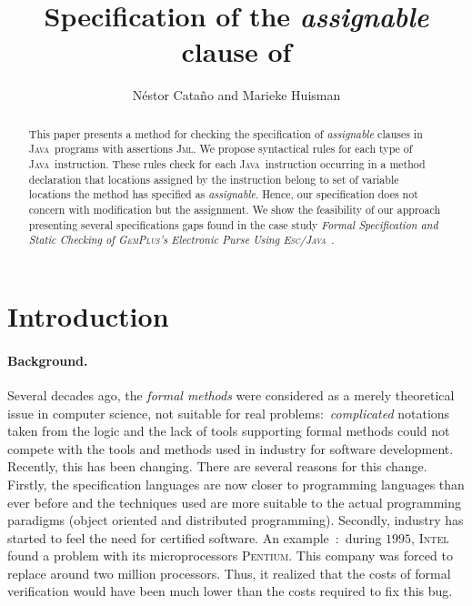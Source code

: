 \documentclass[a4paper]{llncs}
\title{Specification of the \emph{assignable} clause of \jml}
\author{
  N\'estor Cata\~no and Marieke Huisman  \\
  \institute{
       \inria~Sophia-Antipolis, France \\
       \lemme~Project
  } 
  \email{\{Nestor.Catano, Marieke.Huisman\}@sophia.inria.fr}
}
\newcommand{\jml}{\textsc{Jml}}
\newcommand{\java}{\textsc{Java}}
\newcommand{\gplus}{\textsc{GemPlus}}
\begin{document}
\fussy
\maketitle
\pagestyle{plain}

\begin{abstract}
This paper presents a method for checking the specification of
\emph{assignable} clauses in \java~programs with assertions \jml. We
propose syntactical rules for each type of \java~instruction. These
rules check for each \java~instruction occurring in a method
declaration that locations assigned by the instruction belong to set
of variable locations the method has specified as
\emph{assignable}. Hence, our specification does not concern with
modification but the assignment. We show the feasibility of our
approach presenting several specifications gaps found in the case
study \emph{Formal Specification and Static Checking of \gplus's
Electronic Purse Using \textsc{Esc/Java}}~\cite{CatanoH02a}.
\end{abstract}






\section{Introduction}
\label{sec-intro}

\paragraph{\bf Background.}
Several decades ago, the \emph{formal methods} were considered as a merely
theoretical issue in computer science, not suitable for real
problems$:$ \emph{complicated} notations taken from the logic and
the lack of tools supporting formal methods could not compete with the
tools and methods used in industry for software development. Recently, 
this has been changing. There are several reasons for this
change. Firstly, the specification languages are now closer to
programming languages than ever before and the techniques used are
more suitable to the actual programming paradigms (object oriented
and distributed programming). Secondly, industry has started to feel
the need for certified software. An
example~\cite{Borger99programmer}$:$ during $1995$,
\textsc{Intel} found a problem with its microprocessors
\textsc{Pentium}. This company was forced to replace around two
million processors. Thus, it realized that the costs of formal
verification would have been much lower than the costs required to
fix this bug.
\end{document}
